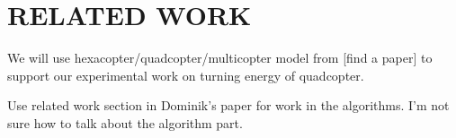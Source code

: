 \section{RELATED WORK}

We will use hexacopter/quadcopter/multicopter model from [find a paper] to support our experimental work on turning energy of quadcopter.

Use related work section in Dominik's paper for work in the algorithms.
I'm not sure how to talk about the algorithm part.

